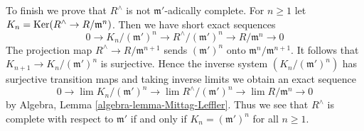 \medskip\noindent
To finish we prove that $R^\wedge$ is not $\mathfrak m'$-adically complete.
For $n \geq 1$ let $K_n = \mathop{\mathrm{Ker}}(R^\wedge \to R/\mathfrak m^n)$. Then
we have short exact sequences
$$
0 \to K_n/(\mathfrak m')^n \to R^\wedge/(\mathfrak m')^n \to
R/\mathfrak m^n \to 0
$$
The projection map $R^\wedge \to R/\mathfrak m^{n + 1}$ sends
$(\mathfrak m')^n$ onto $\mathfrak m^n/\mathfrak m^{n + 1}$.
It follows that $K_{n + 1} \to K_n/(\mathfrak m')^n$ is surjective.
Hence the inverse system $\left(K_n/(\mathfrak m')^n\right)$
has surjective transition maps and
taking inverse limits we obtain an exact sequence
$$
0 \to \lim K_n/(\mathfrak m')^n \to
\lim R^\wedge/(\mathfrak m')^n \to
\lim R/\mathfrak m^n \to 0
$$
by Algebra, Lemma \ref{algebra-lemma-Mittag-Leffler}.
Thus we see that $R^\wedge$ is complete with respect to $\mathfrak m'$
if and only if $K_n = (\mathfrak m')^n$ for all $n \geq 1$.

